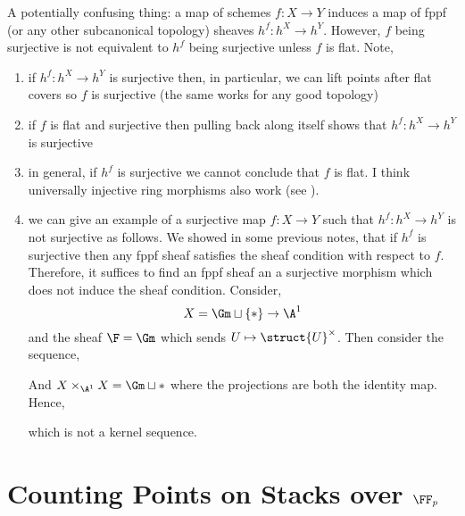 \documentclass[12pt]{article}
\begin{document}
\begin{rmk}
A potentially confusing thing: a map of schemes $f : X \to Y$ induces a map of fppf (or any other subcanonical topology) sheaves $h^f : h^X \to h^Y$. However, $f$ being surjective is not equivalent to $h^f$ being surjective unless $f$ is flat. Note,
\begin{enumerate}
\item if $h^f : h^X \to h^Y$ is surjective then, in particular, we can lift points after flat covers so $f$ is surjective (the same works for any good topology)

\item if $f$ is flat and surjective then pulling back along itself shows that $h^f : h^X \to h^Y$ is surjective

\item in general, if $h^f$ is surjective we cannot conclude that $f$ is flat. I think universally injective ring morphisms also work (see ).

\item we can give an example of a surjective map $f : X \to Y$ such that $h^f : h^X \to h^Y$ is not surjective as follows. We showed in some previous notes, that if $h^f$ is surjective then any fppf sheaf satisfies the sheaf condition with respect to $f$. Therefore, it suffices to find an fppf sheaf an a surjective morphism which does not induce the sheaf condition. Consider, 
\[ X = \Gm \sqcup \{ * \} \to \A^1 \]
and the sheaf $\F = \Gm$ which sends $U \mapsto \struct{U}^\times$. Then consider the sequence,
\begin{center}
\end{center} 
And $X \times_{\A^1} X = \Gm \sqcup *$ where the projections are both the identity map. Hence,
\begin{center}
\end{center}
which is not a kernel sequence.
\end{enumerate}
\end{rmk}

\newpage

\section{Counting Points on Stacks over $\FF_p$}
\end{document}
